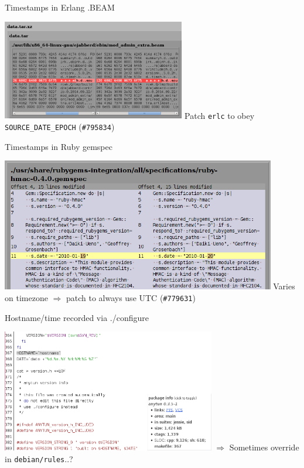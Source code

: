 \documentclass[14pt]{beamer}
\begin{document}

\begin{frame}{Timestamps in Erlang .BEAM}
 \begin{center}
  \includegraphics[width=0.6\textwidth]{images/examples/timestamps_in_beam.png}
  \vfill
  \vfill
  Patch \texttt{erlc} to obey \texttt{SOURCE\_DATE\_EPOCH} (\texttt{\#795834})
 \end{center}
\end{frame}

\begin{frame}{Timestamps in Ruby gemspec}
 \begin{center}
  \includegraphics[width=0.9\textwidth]{images/examples/timestamps_in_ruby_gemspec.png}
  \vfill
  Varies on timezone $\Longrightarrow$ patch to always use UTC (\texttt{\#779631})
 \end{center}
\end{frame}


\begin{frame}{Hostname/time recorded via ./configure}
 \begin{center}
  \includegraphics[width=0.7\textwidth]{images/examples/hostname_in_configure.png}
  \vfill
  $\Longrightarrow$ Sometimes override in \texttt{debian/rules}..?
 \end{center}
\end{frame}
\end{document}
